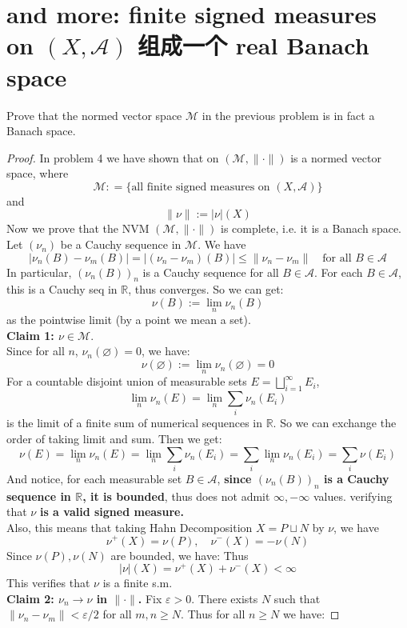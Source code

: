 \documentclass[lang=cn,11pt]{elegantbook}
\begin{document}
\section{and more: finite signed measures on $(X,\mathcal{A})$ 组成一个 real Banach space}
  Prove that the normed vector space $\mathcal{M}$ in the previous problem is in fact a Banach space.
\begin{proof}
In problem 4 we have shown that on $(\mathcal{M}, \|\cdot\|)$ is a normed vector space, where \[
\mathcal{M} : = \{ \text{all finite signed measures on }(X, \mathcal{A})\}
\]
and  \[
\|\nu\| := |\nu|(X)
\]
Now we prove that the NVM $(\mathcal{M}, \|\cdot\|)$ is complete, i.e. it is a Banach space.\\
 Let $(\nu_n)$ be a Cauchy sequence in $\mathcal{M}$. We have
\[
|\nu_n(B) - \nu_m(B)| = |(\nu_n - \nu_m)(B)| \le \|\nu_n - \nu_m\| \quad \text{for all } B \in \mathcal{A}
\]
In particular, $(\nu_n(B))_n$ is a Cauchy sequence for all $B \in \mathcal{A}$. For each $B \in \mathcal{A}$, this is a Cauchy seq in $\mathbb{R}$, thus converges. So we can get: \[
\nu(B) := \lim_n \nu_n(B)
\]
as the pointwise limit (by a point we mean a set).\\
\textbf{Claim 1: $\nu \in \mathcal{M}$}.\\
Since for all $n$, $\nu_n(\varnothing) = 0$, we have:
\[
\nu(\varnothing) := \lim_n \nu_n(\varnothing) = 0
\]
For a countable disjoint union of measurable sets \(E = \bigsqcup_{i=1}^\infty E_i\), \[
 \lim_n   \nu_n(E) = \lim_n \sum_i \nu_n(E_i)
\]is the limit of a finite sum of numerical sequences in $\mathbb{R}$. So we can exchange the order of taking limit and sum. Then we get: \[
  \nu(E) = \lim_n \nu_n(E) = \lim_n \sum_i  \nu_n(E_i) = \sum_i \lim_n \nu_n(E_i) = \sum_i \nu(E_i)
  \]
And notice, for each measurable set $B\in \mathcal{A}$, \textbf{since $(\nu_n(B))_n$ is a Cauchy sequence in $\mathbb{R}$, it is bounded}, thus does not admit $\infty, -\infty$ values. verifying that $\nu$ \textbf{is a valid signed measure.}\\
Also, this means that taking Hahn Decomposition $X = P \sqcup N$ by $\nu$, we have \[
\nu^+ (X) = \nu(P ) ,\quad \nu^- (X) = -\nu(N) 
\]
Since $\nu(P), \nu(N)$ are bounded, we have:
Thus \[
|\nu| (X) =  \nu^+ (X) + \nu^- (X)  < \infty
\]
This verifies that $\nu$ is a finite s.m.\\
\textbf{ Claim 2:  $\nu_n \to \nu$ in $\|\cdot\|$.}
Fix $\varepsilon > 0$. There exists $N$ such that $\|\nu_n - \nu_m\| < \varepsilon / 2$ for all $m, n \ge N$. Thus for all $n\geq N$ we have:

\end{proof}
\end{document}

